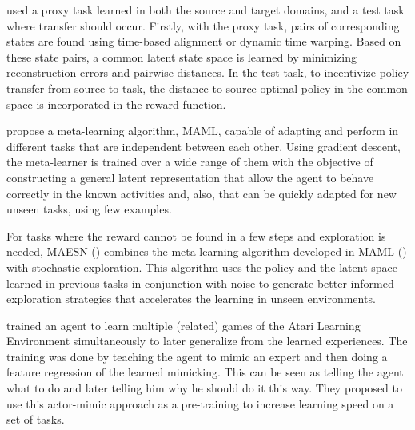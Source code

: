 \citet{gupta2017learning} used a proxy task learned in both the source and target domains, and a test task where transfer should occur. Firstly, with the proxy task, pairs of corresponding states are found using time-based alignment or dynamic time warping. Based on these state pairs, a common latent state space is learned by minimizing reconstruction errors and pairwise distances. In the test task, to incentivize policy transfer from source to task, the distance to source optimal policy in the common space is incorporated in the reward function.

\citet{MAML} propose a meta-learning algorithm, MAML, capable of adapting and perform in different tasks that are independent between each other. Using gradient descent, the meta-learner is trained over a wide range of them with the objective of constructing a general latent representation that allow the agent to behave correctly in the known activities and, also, that can be quickly adapted for new unseen tasks, using few examples.


For tasks where the reward cannot be found in a few steps and exploration is needed, MAESN (\citet{MAESN}) combines the meta-learning algorithm developed in MAML (\citet{MAML}) with stochastic exploration. This algorithm uses the policy and the latent space learned in previous tasks in conjunction with noise to generate better informed exploration strategies that accelerates the learning in unseen environments. 


\citet{parisotto2015actor} trained an agent to learn multiple (related) games of the Atari Learning Environment simultaneously to later generalize from the learned experiences. The training was done by teaching the agent to mimic an expert and then doing a feature regression of the learned mimicking. This can be seen as telling the agent what to do and later telling him why he should do it this way. They proposed to use this actor-mimic approach as a pre-training to increase learning speed on a set of tasks.

